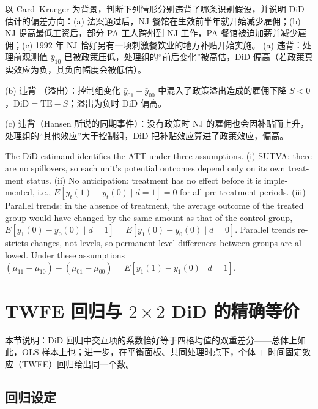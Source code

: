 \begin{prac}[判断违背了哪条假设]\label{prac:U15a-viol}
以 Card--Krueger 为背景，判断下列情形分别违背了哪条识别假设，并说明 DiD 估计的偏差方向：(a) 法案通过后，NJ 餐馆在生效前半年就开始减少雇佣；(b) NJ 提高最低工资后，部分 PA 工人跨州到 NJ 工作，PA 餐馆被迫加薪并减少雇佣；(c) 1992 年 NJ 恰好另有一项刺激餐饮业的地方补贴开始实施。
\answer
(a) 违背：处理前观测值 $\bar y_{10}$ 已被政策压低，处理组的“前后变化”被高估，DiD 偏高（若政策真实效应为负，其负向幅度会被低估）。

(b) 违背 （溢出）：控制组变化 $\bar y_{01}-\bar y_{00}$ 中混入了政策溢出造成的雇佣下降 $S<0$，$\mathrm{DiD}=\mathrm{TE}-S$；溢出为负时 DiD 偏高。

(c) 违背（Hansen 所说的同期事件）：没有政策时 NJ 的雇佣也会因补贴而上升，处理组的“其他效应”大于控制组，DiD 把补贴效应算进了政策效应，偏高。
\end{prac}

\begin{english}
The DiD estimand identifies the ATT under three assumptions. (i) SUTVA: there are no spillovers, so each unit's potential outcomes depend only on its own treatment status. (ii) No anticipation: treatment has no effect before it is implemented, i.e., $E[y_t(1)-y_t(0)\mid d=1]=0$ for all pre-treatment periods. (iii) Parallel trends: in the absence of treatment, the average outcome of the treated group would have changed by the same amount as that of the control group, $E[y_1(0)-y_0(0)\mid d=1]=E[y_1(0)-y_0(0)\mid d=0]$. Parallel trends restricts changes, not levels, so permanent level differences between groups are allowed. Under these assumptions $(\mu_{11}-\mu_{10})-(\mu_{01}-\mu_{00})=E[y_1(1)-y_1(0)\mid d=1]$.
\end{english}

\section{TWFE 回归与 \texorpdfstring{$2\times2$}{2x2} DiD 的精确等价}\label{sec:U15a-twfe}

本节说明：DiD 回归中交互项的系数恰好等于四格均值的双重差分——总体上如此，OLS 样本上也；进一步，在平衡面板、共同处理时点下，个体 $+$ 时间固定效应（TWFE）回归给出同一个数。

\subsection{回归设定}

